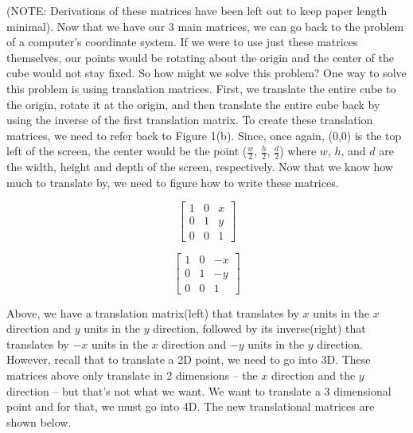 \documentclass[14pt]{article}
\begin{document}
(NOTE: Derivations of these 	matrices have been left out to keep paper length minimal). Now that we have our 3 main matrices, we can go back to the problem of a computer's coordinate system. If we were to use just these matrices themselves, our points would be rotating about the origin and the center of the cube would not stay fixed. So how might we solve this problem? One way to solve this problem is using translation matrices. First, we translate the entire cube to the origin, rotate it at the origin, and then translate the entire cube back by using the inverse of the first translation matrix. To create these translation matrices, we need to refer back to Figure 1(b). Since, once again, (0,0) is the top left of the screen, the center would be the point ($\frac{w}{2}$, $\frac{h}{2}$, $\frac{d}{2}$) where $w$, $h$, and $d$ are the width, height and depth of the screen, respectively. Now that we know how much to translate by, we need to figure how to write these matrices.

\begin{figure}[H]
	\begin{center}
		\begin{minipage}[b]{0.45\textwidth}
			\centering
			
			$$
			\begin{bmatrix}
			1 & 0 & x \\
			0 & 1 & y \\ 
			0 & 0 & 1
			\end{bmatrix}
			$$
		\end{minipage}
		\hfill
		\begin{minipage}[b]{0.45\textwidth}
			\centering
			$$
			\begin{bmatrix}
			1 & 0 & -x \\
			0 & 1 & -y \\ 
			0 & 0 & 1
			\end{bmatrix}			
			$$
		\end{minipage}
	\end{center}
\end{figure}

Above, we have a translation matrix(left) that translates by $x$ units in the $x$ direction and $y$ units in the $y$ direction, followed by its inverse(right) that translates by $-x$ units in the $x$ direction and $-y$ units in the $y$ direction. However, recall that to translate a 2D point, we need to go into 3D. These matrices above only translate in 2 dimensions -- the $x$ direction and the $y$ direction -- but that's not what we want. We want to translate a 3 dimensional point and for that, we must go into 4D. The new translational matrices are shown below.
\end{document}
